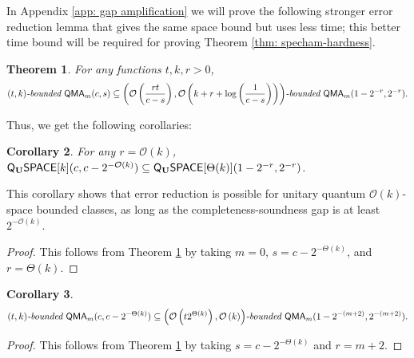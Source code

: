 \documentclass[11pt]{article}
\newtheorem{theorem}{Theorem}
\newtheorem{corollary}[theorem]{Corollary}
\theoremstyle{definition}
\theoremstyle{remark}
\newcommand\QMA{{\sf{QMA}}}
\newcommand\bddQMA[5]{{\left(#1,#2\right)}\textit{-bounded }\QMA_{#3}(#4,#5)}
\newcommand{\classfont}{\sf}
\newcommand{\Unitary}{\mathbf{U}}
\newcommand{\unitaryQSPACE}[3]{{\classfont{Q}_\Unitary\classfont{SPACE}}[#1](#2,#3)}
\newcommand\bigoh{\mathcal{O}}
\begin{document}
In Appendix \ref{app: gap amplification} we will prove the following stronger error reduction lemma that gives the same space bound but uses less time; this better time bound will be required for proving Theorem \ref{thm: specham-hardness}.

\begin{theorem} \label{thm: gap amp}
For any functions $t,k,r>0$, 
\[
\bddQMA{t}{k}{m}{c}{s}\subseteq\bddQMA{\mathcal{O}\left(\frac{rt}{c-s}\right)}{\mathcal{O}\left(k+r+\log\left(\frac{1}{c-s}\right)\right)}{m}{1-2^{-r}}{2^{-r}}.
\]
\end{theorem}


Thus, we get the following corollaries:
\begin{corollary} \label{obvious2} For any $r = \mathcal{O}(k)$,
$
\unitaryQSPACE{k}{c}{c-2^{-\bigoh (k)}} \subseteq
\unitaryQSPACE{\Theta(k)}{1-2^{-r}}{2^{-r}}$.
\end{corollary}
This corollary shows that error reduction is possible for unitary quantum $\bigoh(k)$-space bounded classes, as long as the completeness-soundness gap is at least $2^{-\bigoh (k)}$.
\begin{proof}
This follows from Theorem \ref{thm: gap amp} by taking $m=0$, $s = c-2^{-\Theta(k)}$, and $r = \Theta(k)$.
\end{proof}
\begin{corollary}\label{obvious1}
\[
\bddQMA{t}{k}{m}{c}{c-2^{-\Theta(k)}}\subseteq\bddQMA{\mathcal{O}\left(t2^{\Theta(k)}\right)}{\mathcal{O}\left(k\right)}{m}{1-2^{-(m+2)}}{2^{-(m+2)}}.
\]
\end{corollary}
\begin{proof}
This follows from Theorem \ref{thm: gap amp} by taking $s = c-2^{-\Theta(k)}$ and $r = m+2$.
\end{proof}
\end{document}
